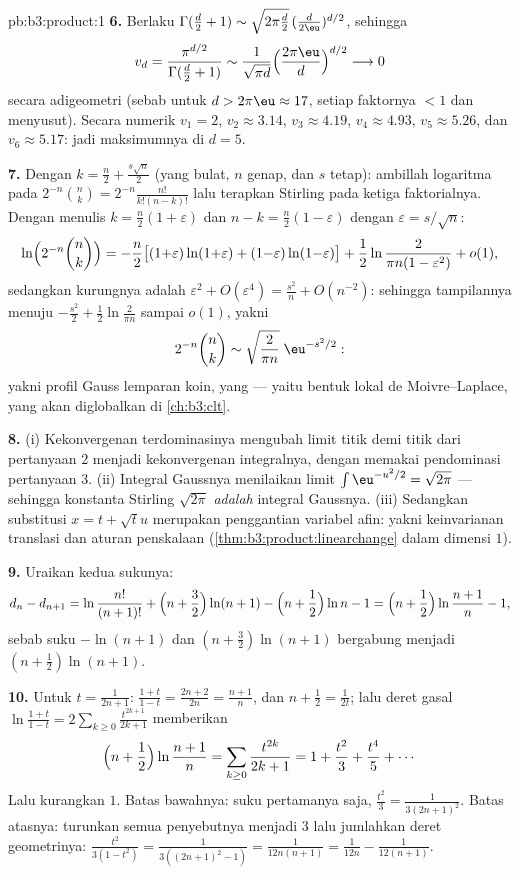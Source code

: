 \begin{solution}{pb:b3:product:1}
\textbf{6.} Berlaku $\Gamma(\frac d2 + 1) \sim \sqrt{2\pi\frac
d2}\,(\frac d{2\eu})^{d/2}$, sehingga
\[
v_d = \frac{\pi^{d/2}}{\Gamma(\frac d2 + 1)}
\sim \frac{1}{\sqrt{\pi d}}\Bigl(\frac{2\pi\eu}
d\Bigr)^{d/2} \longrightarrow 0
\]
secara adigeometri (sebab untuk $d > 2\pi\eu \approx 17$, setiap faktornya
$< 1$ dan menyusut). Secara numerik $v_1 = 2$, $v_2 \approx
3.14$, $v_3 \approx 4.19$, $v_4 \approx 4.93$, $v_5 \approx
5.26$, dan $v_6 \approx 5.17$: jadi maksimumnya di $d = 5$.

\textbf{7.} Dengan $k = \frac n2 + \frac{s\sqrt n}2$ (yang bulat,
$n$ genap, dan $s$ tetap): ambillah logaritma pada $2^{-n}\binom nk =
2^{-n}\frac{n!}{k!(n-k)!}$ lalu terapkan Stirling pada ketiga
faktorialnya. Dengan menulis $k = \frac n2(1 + \varepsilon)$ dan $n - k =
\frac n2(1 - \varepsilon)$ dengan $\varepsilon = s/\sqrt n$:
\[
\ln\Bigl(2^{-n}\binom nk\Bigr)
= -\frac n2\bigl[(1{+}\varepsilon)\ln(1{+}\varepsilon) +
(1{-}\varepsilon)\ln(1{-}\varepsilon)\bigr]
+ \frac12\ln\frac{2}{\pi n(1 - \varepsilon^2)} + o(1),
\]
sedangkan kurungnya adalah $\varepsilon^2 + O(\varepsilon^4) =
\frac{s^2}n + O(n^{-2})$: sehingga tampilannya menuju $-\frac{s^2}2 +
\frac12\ln\frac2{\pi n}$ sampai $o(1)$, yakni
\[
2^{-n}\binom nk \sim \sqrt{\frac{2}{\pi
n}}\;\eu^{-s^2/2} :
\]
yakni profil Gauss lemparan koin, yang  ---
yaitu bentuk lokal de Moivre--Laplace, yang akan diglobalkan di
\cref{ch:b3:clt}.

\textbf{8.} (i) Kekonvergenan terdominasinya mengubah limit titik demi titik dari pertanyaan 2
menjadi kekonvergenan integralnya, dengan memakai pendominasi
pertanyaan 3. (ii) Integral Gaussnya menilaikan limit
$\int\eu^{-u^2/2} = \sqrt{2\pi}$ --- sehingga konstanta Stirling
$\sqrt{2\pi}$ \emph{adalah} integral Gaussnya. (iii) Sedangkan
substitusi $x = t + \sqrt tu$ merupakan penggantian variabel
afin: yakni keinvarianan translasi dan aturan penskalaan
 (\cref{thm:b3:product:linearchange} dalam
dimensi $1$).

\textbf{9.} Uraikan kedua sukunya:
\[
d_n - d_{n+1} = \ln\frac{n!}{(n+1)!} + \Bigl(n +
\frac32\Bigr)\ln(n+1) - \Bigl(n + \frac12\Bigr)\ln n - 1
= \Bigl(n + \frac12\Bigr)\ln\frac{n+1}n - 1,
\]
sebab suku $-\ln(n+1)$ dan $(n + \frac32)\ln(n+1)$ bergabung
menjadi $(n + \frac12)\ln(n+1)$.

\textbf{10.} Untuk $t = \frac1{2n+1}$: $\frac{1+t}{1-t} =
\frac{2n+2}{2n} = \frac{n+1}n$, dan $n + \frac12 =
\frac1{2t}$; lalu deret gasal $\ln\frac{1+t}{1-t} =
2\sum_{k\geq0}\frac{t^{2k+1}}{2k+1}$ memberikan
\[
\Bigl(n + \frac12\Bigr)\ln\frac{n+1}n
= \sum_{k\geq0}\frac{t^{2k}}{2k+1}
= 1 + \frac{t^2}3 + \frac{t^4}5 + \cdots
\]
Lalu kurangkan $1$. Batas bawahnya: suku pertamanya saja,
$\frac{t^2}3 = \frac1{3(2n+1)^2}$. Batas atasnya: turunkan semua
penyebutnya menjadi $3$ lalu jumlahkan deret geometrinya:
$\frac{t^2}{3(1 - t^2)} = \frac1{3((2n+1)^2 - 1)} =
\frac1{12n(n+1)} = \frac1{12n} - \frac1{12(n+1)}$.


\end{solution}
